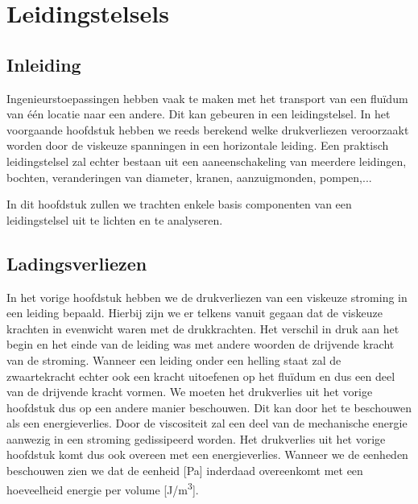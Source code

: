 \chapter{Leidingstelsels}
\label{sec:Leidingstelsels}

	\section{Inleiding}
	\label{sec:Leidingstelsels Inleiding}
Ingenieurstoepassingen hebben vaak te maken met het transport van een fluïdum van één locatie naar een andere. Dit kan gebeuren in een leidingstelsel. In het voorgaande hoofdstuk hebben we reeds berekend welke drukverliezen veroorzaakt worden door de viskeuze spanningen in een horizontale leiding. Een praktisch leidingstelsel zal echter bestaan uit een aaneenschakeling van meerdere leidingen, bochten, veranderingen van diameter, kranen, aanzuigmonden, pompen,...

In dit hoofdstuk zullen we trachten enkele basis componenten van een leidingstelsel uit te lichten en te analyseren.

	\section{Ladingsverliezen}
	\label{sec:Ladingsverliezen}
In het vorige hoofdstuk hebben we de drukverliezen van een viskeuze stroming in een leiding bepaald. Hierbij zijn we er telkens vanuit gegaan dat de viskeuze krachten in evenwicht waren met de drukkrachten. Het verschil in druk aan het begin en het einde van de leiding was met andere woorden de drijvende kracht van de stroming. Wanneer een leiding onder een helling staat zal de zwaartekracht echter ook een kracht uitoefenen op het fluïdum en dus een deel van de drijvende kracht vormen. We moeten het drukverlies uit het vorige hoofdstuk dus op een andere manier beschouwen. Dit kan door het te beschouwen als een energieverlies. Door de viscositeit zal een deel van de mechanische energie aanwezig in een stroming gedissipeerd worden. Het drukverlies uit het vorige hoofdstuk komt dus ook overeen met een energieverlies. Wanneer we de eenheden beschouwen zien we dat de eenheid [\unit{Pa}] inderdaad overeenkomt met een hoeveelheid energie per volume [\unit{J/m^3}].

